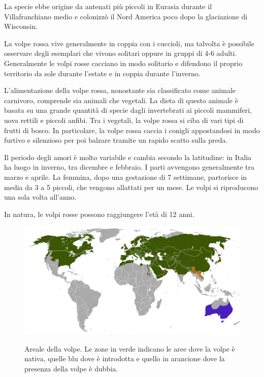 \documentclass[11pt]{article}
\begin{document}
La specie ebbe origine da antenati più piccoli in Eurasia durante il Villafranchiano medio \cite{KurtenBjorn} e colonizzò il Nord America poco dopo la glaciazione di Wisconsin.\cite{Kurten1980Sep}

La volpe rossa vive generalmente in coppia con i cuccioli, ma talvolta è possibile osservare degli esemplari che vivono solitari oppure in gruppi di 4-6 adulti. Generalmente le volpi rosse cacciano in modo solitario e difendono il proprio territorio da sole durante l'estate e in coppia durante l'inverno. 

L'alimentazione della volpe rossa, nonostante sia classificato come animale carnivoro, comprende sia animali che vegetali. La dieta di questo animale è basata su una grande quantità di specie dagli invertebrati ai piccoli mammiferi, uova rettili e piccoli anfibi. Tra i vegetali, la volpe rossa si ciba di vari tipi di frutti di bosco. In particolare, la volpe rossa caccia i conigli appostandosi in modo furtivo e silenzioso per poi balzare tramite un rapido scatto sulla preda. 

Il periodo degli amori è molto variabile e cambia secondo la latitudine: in Italia ha luogo in inverno, tra dicembre e febbraio. I parti avvengono generalmente tra marzo e aprile. La femmina, dopo una gestazione di 7 settimane, partorisce in media da 3 a 5 piccoli, che vengono allattati per un mese. Le volpi si riproducono una sola volta all'anno. 

In natura, le volpi rosse possono raggiungere l'età di 12 anni.

\begin{figure}[h]
    \centering
    \includegraphics[scale = 0.3]{ArealeDellaVolpe.png}
    \label{figArealeVolpe}
    \caption{Areale della volpe. Le zone in verde indicano le aree dove la volpe è nativa, quelle blu dove è introdotta e quello in arancione dove la presenza della volpe è dubbia. }
\end{figure}
\end{document}
